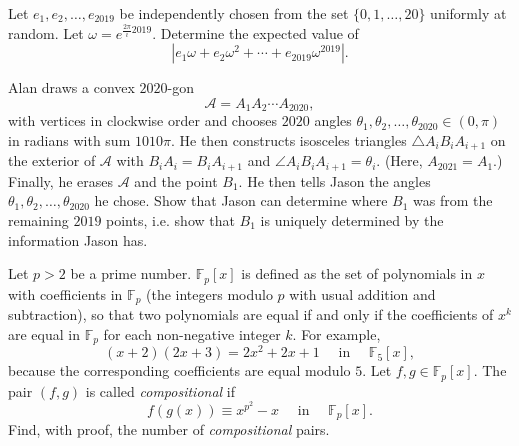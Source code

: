 \documentclass[11pt]{article}
\theoremstyle{definition}
\begin{document}
\begin{question}[name={2019 PUMaC, Team Round, \href{https://artofproblemsolving.com/community/c4p23950940}{Problem 13}}]
	Let $e_1, e_2, \dots, e_{2019}$ be independently chosen from the set $\{0, 1, \dots , 20\}$ uniformly at random.
	Let $\omega = e^{\frac{2\pi}{i} 2019}$. Determine the expected value of $$|e_1\omega + e_2\omega^2 + \cdots + e_{2019}\omega^{2019}|.$$
\end{question}










\begin{question}[name={2019 HMMT, Team, \href{https://artofproblemsolving.com/community/c129h1786129p11794991}{Problem 3}}]
	Alan draws a convex $2020$-gon $$\mathcal{A}=A_1A_2\dotsm A_{2020},$$ with vertices in clockwise order and chooses $2020$ angles $\theta_1, \theta_2, \dotsc, \theta_{2020}\in (0, \pi)$ in radians with sum $1010\pi$. He then constructs isosceles triangles $\triangle A_iB_iA_{i+1}$ on the exterior of $\mathcal{A}$ with $B_iA_i=B_iA_{i+1}$ and $\angle A_iB_iA_{i+1}=\theta_i$. (Here, $A_{2021}=A_1$.) Finally, he erases $\mathcal{A}$ and the point $B_1$. He then tells Jason the angles $\theta_1, \theta_2, \dotsc, \theta_{2020}$ he chose. Show that Jason can determine where $B_1$ was from the remaining $2019$ points, i.e. show that $B_1$ is uniquely determined by the information Jason has.
\end{question}





\begin{question}[name={2019 HMMT, Team, \href{https://artofproblemsolving.com/community/c129h1786136p11795007}{Problem 9}}]
	Let $p > 2$ be a prime number. $\mathbb{F}_p[x]$ is defined as the set of polynomials in $x$ with coefficients in $\mathbb{F}_p$ (the integers modulo $p$ with usual addition and subtraction), so that two polynomials are equal if and only if the coefficients of $x^k$ are equal in $\mathbb{F}_p$ for each non-negative integer $k$. For example, $$(x+2)(2x+3) = 2x^2 + 2x + 1 \quad \text{  in } \quad \mathbb{F}_5[x],$$ because the corresponding coefficients are equal modulo $5$. Let $f, g \in \mathbb{F}_p[x]$. The pair $(f, g)$ is called \textit{compositional} if
	\[f(g(x)) \equiv x^{p^2} - x \quad \text{ in } \quad \mathbb{F}_p[x].\] Find, with proof, the number of \textit{compositional} pairs.
\end{question}
\end{document}
